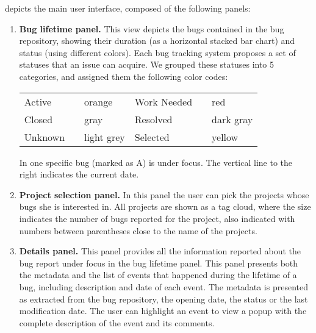  depicts the main user interface, composed of the following panels:

\begin{enumerate}

\item {\bf Bug lifetime panel.} This view depicts the bugs contained in the bug repository, showing their duration (as a horizontal stacked bar chart) and status (using different colors). Each bug tracking system proposes a set of statuses that an issue can acquire. We grouped these statuses into 5 categories, and assigned them the following color codes:

\begin{center}
  {\scriptsize
  \begin{tabular}{p{1.4cm} p{0.1cm} p{1.3cm} | p{1.4cm} p{0.1cm} p{1.2cm} } \hline
  Active & \cellcolor{active} & orange & Work Needed & \cellcolor{work needed} & red \\
  
  Closed & \cellcolor{closed} & gray & Resolved & \cellcolor{resolved} & dark gray \\

  Unknown & \cellcolor{unknown} & light grey & Selected & \cellcolor{yellow} & yellow \\ \hline
  \end{tabular}}
\end{center}



In  one specific bug (marked as A) is under focus. The vertical line to the right indicates the current date.

\item {\bf Project selection panel.} In this panel the user can pick the projects whose bugs she is interested in. All projects are shown as a tag cloud, where the size indicates the number of bugs reported for the project, also indicated with numbers between parentheses close to the name of the projects. 

\item {\bf Details panel.} This panel provides all the information reported about the bug report under focus in the bug lifetime panel. This panel presents both the metadata and the list of events that happened during the lifetime of a bug, including description and date of each event. The metadata is presented as extracted from the bug repository, \eg the opening date, the status or the last modification date. The user can highlight an event to view a popup with the complete description of the event and its comments.


\end{enumerate}
